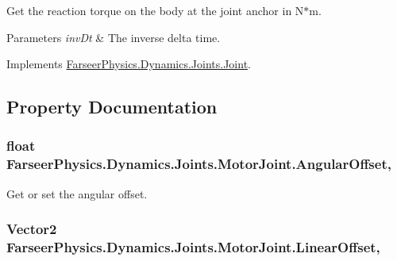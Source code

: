 Get the reaction torque on the body at the joint anchor in N$\ast$m. 


\begin{DoxyParams}{Parameters}
{\em inv\+Dt} & The inverse delta time.\\
\hline
\end{DoxyParams}


Implements \hyperlink{class_farseer_physics_1_1_dynamics_1_1_joints_1_1_joint_a21899d3bdf15c22ef4dc288ed2082cbc}{Farseer\+Physics.\+Dynamics.\+Joints.\+Joint}.



\subsection{Property Documentation}
\hypertarget{class_farseer_physics_1_1_dynamics_1_1_joints_1_1_motor_joint_abc065261bb1090dea10246e1a7a2d9e6}{
\subsubsection[{Angular\+Offset}]{\setlength{\rightskip}{0pt plus 5cm}float Farseer\+Physics.\+Dynamics.\+Joints.\+Motor\+Joint.\+Angular\+Offset\hspace{0.3cm}{\ttfamily [get]}, {\ttfamily [set]}}}\label{class_farseer_physics_1_1_dynamics_1_1_joints_1_1_motor_joint_abc065261bb1090dea10246e1a7a2d9e6}


Get or set the angular offset. 

\hypertarget{class_farseer_physics_1_1_dynamics_1_1_joints_1_1_motor_joint_a0183de97eccd0e558e2e068159341efc}{
\subsubsection[{Linear\+Offset}]{\setlength{\rightskip}{0pt plus 5cm}Vector2 Farseer\+Physics.\+Dynamics.\+Joints.\+Motor\+Joint.\+Linear\+Offset\hspace{0.3cm}{\ttfamily [get]}, {\ttfamily [set]}}}\label{class_farseer_physics_1_1_dynamics_1_1_joints_1_1_motor_joint_a0183de97eccd0e558e2e068159341efc}


